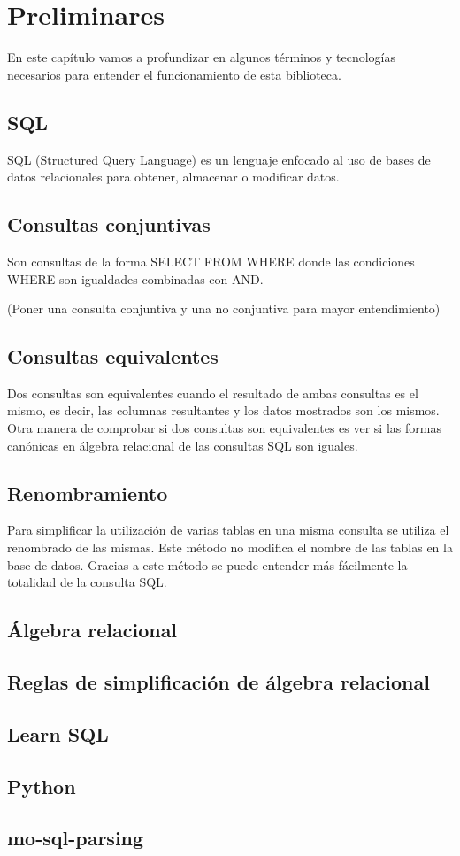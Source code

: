 \chapter{Preliminares}
\noindent

En este capítulo vamos a profundizar en algunos términos y tecnologías necesarios para entender el funcionamiento de esta biblioteca.

\section{SQL}
SQL (Structured Query Language) es un lenguaje enfocado al uso de bases de datos relacionales para obtener, almacenar o modificar datos.

\section{Consultas conjuntivas}
Son consultas de la forma SELECT FROM WHERE donde las condiciones WHERE son igualdades combinadas con AND.

(Poner una consulta conjuntiva y una no conjuntiva para mayor entendimiento)

\section{Consultas equivalentes}
Dos consultas son equivalentes cuando el resultado de ambas consultas es el mismo, es decir, las columnas resultantes y los datos mostrados son los mismos.
Otra manera de comprobar si dos consultas son equivalentes es ver si las formas canónicas en álgebra relacional de las consultas SQL son iguales.

\section{Renombramiento}
Para simplificar la utilización de varias tablas en una misma consulta se utiliza el renombrado de las mismas. Este método no modifica el nombre de las tablas en la base de datos. Gracias a este método se puede entender más fácilmente la totalidad de la consulta SQL.

\section{Álgebra relacional}

\section{Reglas de simplificación de álgebra relacional}

\section{Learn SQL}

\section{Python}

\section{mo-sql-parsing}